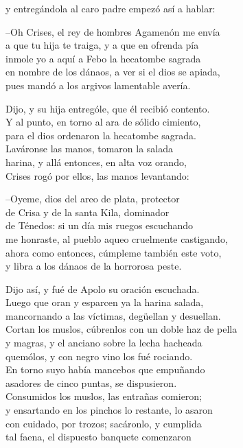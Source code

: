 \documentclass[11pt,twoside]{article}
\begin{document}
y entregándola al caro padre empezó así a hablar:\par
--Oh Crises, el rey de hombres Agamenón me envía\\
a que tu hija te traiga, y a que en ofrenda pía\\
inmole yo a aquí a Febo la hecatombe sagrada\\
en nombre de los dánaos, a ver si el dios se apiada,\\
pues mandó a los argivos lamentable avería.\par
Dijo, y su hija entrególe, que él recibió contento.\\
Y al punto, en torno al ara de sólido cimiento,\\
para el dios ordenaron la hecatombe sagrada.\\
Laváronse las manos, tomaron la salada\\
harina, y allá entonces, en alta voz orando,\\
Crises rogó por ellos, las manos levantando:\par
--Oyeme, dios del areo de plata, protector\\
de Crisa y de la santa Kila, dominador\\
de Ténedos: si un día mis ruegos escuchando\\
me honraste, al pueblo aqueo cruelmente castigando,\\
ahora como entonces, cúmpleme también este voto,\\
y libra a los dánaos de la horrorosa peste.\par
Dijo así, y fué de Apolo su oración escuchada.\\
Luego que oran y esparcen ya la harina salada,\\
mancornando a las víctimas, degüellan y desuellan.\\
Cortan los muslos, cúbrenlos con un doble haz de pella\\
y magras, y el anciano sobre la lecha hacheada\\
quemólos, y con negro vino los fué rociando.\\
En torno suyo había mancebos que empuñando\\
asadores de cinco puntas, se dispusieron.\\
Consumidos los muslos, las entrañas comieron;\\
y ensartando en los pinchos lo restante, lo asaron\\
con cuidado, por trozos; sacáronlo, y cumplida\\
tal faena, el dispuesto banquete comenzaron\\
\end{document}
